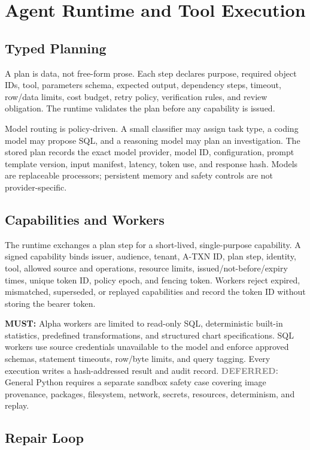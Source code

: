\documentclass[10pt]{article}
\newcommand{\atxn}{\textsc{A-TXN}\xspace}
\newcommand{\must}{\textbf{\textcolor{amosblue}{MUST:}}\xspace}
\newcommand{\deferred}{\textbf{\textcolor{gray}{DEFERRED:}}\xspace}
\begin{document}
\section{Agent Runtime and Tool Execution}

\subsection{Typed Planning}

A plan is data, not free-form prose. Each step declares purpose, required object IDs, tool, parameters schema, expected output, dependency steps, timeout, row/data limits, cost budget, retry policy, verification rules, and review obligation. The runtime validates the plan before any capability is issued.

Model routing is policy-driven. A small classifier may assign task type, a coding model may propose SQL, and a reasoning model may plan an investigation. The stored plan records the exact model provider, model ID, configuration, prompt template version, input manifest, latency, token use, and response hash. Models are replaceable processors; persistent memory and safety controls are not provider-specific.

\subsection{Capabilities and Workers}

The runtime exchanges a plan step for a short-lived, single-purpose capability. A signed capability binds issuer, audience, tenant, \atxn ID, plan step, identity, tool, allowed source and operations, resource limits, issued/not-before/expiry times, unique token ID, policy epoch, and fencing token. Workers reject expired, mismatched, superseded, or replayed capabilities and record the token ID without storing the bearer token.

\must Alpha workers are limited to read-only SQL, deterministic built-in statistics, predefined transformations, and structured chart specifications. SQL workers use source credentials unavailable to the model and enforce approved schemas, statement timeouts, row/byte limits, and query tagging. Every execution writes a hash-addressed result and audit record. \deferred General Python requires a separate sandbox safety case covering image provenance, packages, filesystem, network, secrets, resources, determinism, and replay.

\subsection{Repair Loop}
\end{document}
